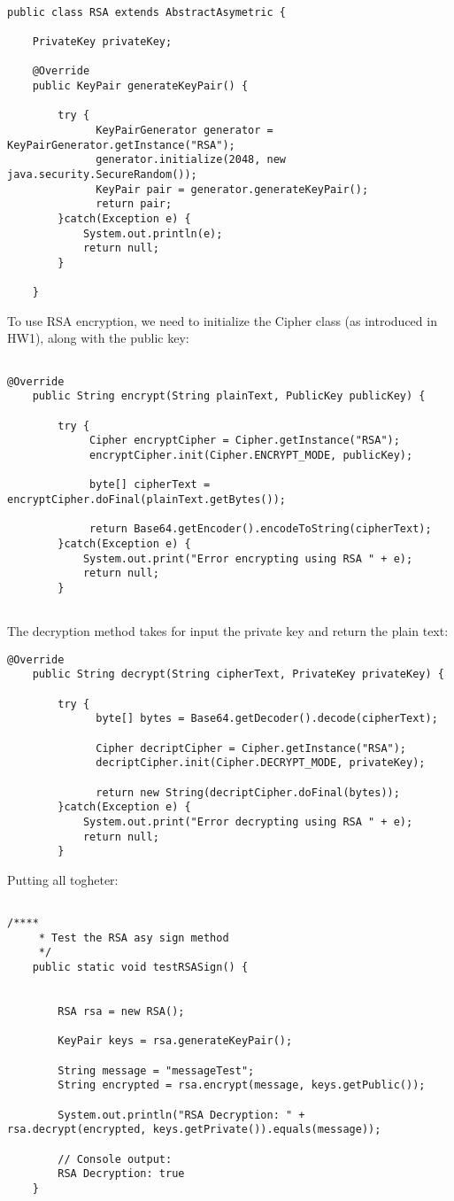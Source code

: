 \documentclass{article}
\begin{document}
\begin{verbatim}

public class RSA extends AbstractAsymetric {

	PrivateKey privateKey;

	@Override
	public KeyPair generateKeyPair() {
		
		try {
			  KeyPairGenerator generator = KeyPairGenerator.getInstance("RSA");
			  generator.initialize(2048, new java.security.SecureRandom());
			  KeyPair pair = generator.generateKeyPair();
			  return pair;
		}catch(Exception e) {
			System.out.println(e);
			return null;
		}
	  
	}
\end{verbatim}
To use RSA encryption, we need to initialize the Cipher class (as introduced in HW1), along with the public key:

\begin{verbatim}

@Override
	public String encrypt(String plainText, PublicKey publicKey) {
		
		try {
			 Cipher encryptCipher = Cipher.getInstance("RSA");
		     encryptCipher.init(Cipher.ENCRYPT_MODE, publicKey);

		     byte[] cipherText = encryptCipher.doFinal(plainText.getBytes());

		     return Base64.getEncoder().encodeToString(cipherText);
		}catch(Exception e) {
			System.out.print("Error encrypting using RSA " + e);
			return null;
		}
	
\end{verbatim}
The decryption method takes for input the private key and return the plain text:

\begin{verbatim}
@Override
	public String decrypt(String cipherText, PrivateKey privateKey) {
		
		try {
			  byte[] bytes = Base64.getDecoder().decode(cipherText);

		      Cipher decriptCipher = Cipher.getInstance("RSA");
		      decriptCipher.init(Cipher.DECRYPT_MODE, privateKey);

		      return new String(decriptCipher.doFinal(bytes));
		}catch(Exception e) {
			System.out.print("Error decrypting using RSA " + e);
			return null;
		}

\end{verbatim}
Putting all togheter:

\begin{verbatim}

/****
	 * Test the RSA asy sign method
	 */
	public static void testRSASign() {
		
		
		RSA rsa = new RSA();
		
		KeyPair keys = rsa.generateKeyPair();
		
		String message = "messageTest";
		String encrypted = rsa.encrypt(message, keys.getPublic());
		
		System.out.println("RSA Decryption: " +  rsa.decrypt(encrypted, keys.getPrivate()).equals(message));
		
		// Console output:
		RSA Decryption: true
	}

\end{verbatim}
\end{document}

